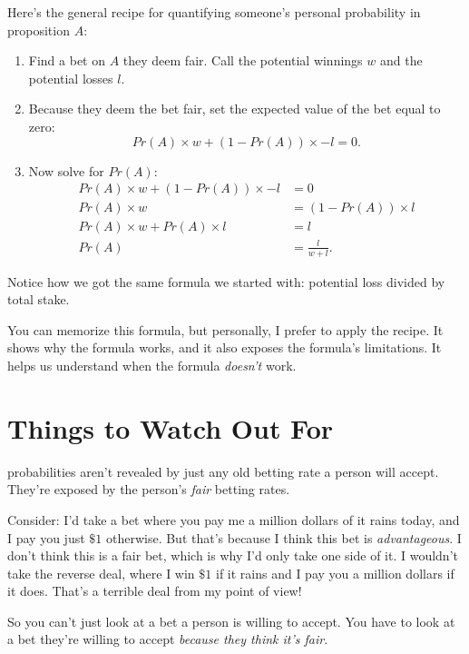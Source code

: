 \documentclass[justified]{tufte-book}
\providecommand{\tightlist}{%
  \setlength{\itemsep}{0pt}\setlength{\parskip}{0pt}}
\newcommand{\p}{Pr}
\theoremstyle{definition}
\theoremstyle{definition}
\theoremstyle{definition}
\theoremstyle{remark}
\begin{document}
Here's the general recipe for quantifying someone's personal probability
in proposition \(A\):

\begin{enumerate}
\def\labelenumi{\arabic{enumi}.}
\tightlist
\item
  Find a bet on \(A\) they deem fair. Call the potential winnings \(w\)
  and the potential losses \(l\).
\item
  Because they deem the bet fair, set the expected value of the bet
  equal to zero: \[ \p(A) \times w + (1-\p(A)) \times -l = 0. \]
\item
  Now solve for \(\p(A)\): \[
     \begin{aligned}
       \p(A) \times w + (1-\p(A)) \times -l &= 0 \\
                             \p(A) \times w &= (1-\p(A)) \times l \\
            \p(A) \times w + \p(A) \times l &= l \\
                                      \p(A) &= \frac{l}{w + l}.
     \end{aligned}
   \]
\end{enumerate}

Notice how we got the same formula we started with: potential loss
divided by total stake.

You can memorize this formula, but personally, I prefer to apply the
recipe. It shows why the formula works, and it also exposes the
formula's limitations. It helps us understand when the formula
\emph{doesn't} work.

\hypertarget{things-to-watch-out-for}{%
\section{Things to Watch Out For}\label{things-to-watch-out-for}}

 probabilities aren't revealed by just any old
betting rate a person will accept. They're exposed by the person's
\emph{fair} betting rates.

Consider: I'd take a bet where you pay me a million dollars of it rains
today, and I pay you just \(\$1\) otherwise. But that's because I think
this bet is \emph{advantageous}. I don't think this is a fair bet, which
is why I'd only take one side of it. I wouldn't take the reverse deal,
where I win \(\$1\) if it rains and I pay you a million dollars if it
does. That's a terrible deal from my point of view!

So you can't just look at a bet a person is willing to accept. You have
to look at a bet they're willing to accept \emph{because they think it's
fair}.
\end{document}
